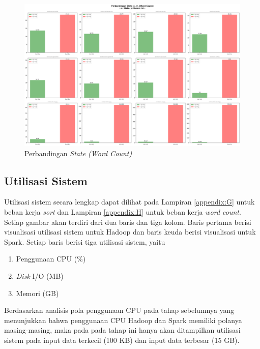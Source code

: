 \begin{landscape}
\begin{figure}[h]
    \centering
    \includegraphics[height=0.6\linewidth]{figures/ch04/4-state-wordcount.png}
    \caption{Perbandingan \textit{State  (Word Count)}}
    \label{fig:4-state-wordcount}
\end{figure}
\end{landscape}

\newpage
\subsection{Utilisasi Sistem}
Utilisasi sistem secara lengkap dapat dilihat pada Lampiran \ref{appendix:G} untuk beban kerja \textit{sort} dan Lampiran \ref{appendix:H} untuk beban kerja \textit{word count}. Setiap gambar akan terdiri dari dua baris dan tiga kolom. Baris pertama berisi visualisasi utilisasi sistem untuk Hadoop dan baris keuda berisi visualisasi untuk Spark. Setiap baris berisi tiga utilisasi sistem, yaitu 
\begin{enumerate}
	\item Penggunaan CPU (\%)
	\item \textit{Disk} I/O (MB)
	\item Memori (GB)
\end{enumerate}

Berdasarkan analisis pola penggunaan CPU pada tahap sebelumnya yang menunjukkan bahwa penggunaan CPU Hadoop dan Spark memiliki polanya masing-masing, maka pada pada tahap ini hanya akan ditampilkan utilisasi sistem pada input data terkecil (100 KB) dan input data terbesar (15 GB). 

